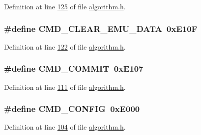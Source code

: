 Definition at line \hyperlink{a00021_source_l00125}{125} of file \hyperlink{a00021_source}{algorithm.\+h}.

\hypertarget{a00021_aa5f71f685588bc4e978cd6d595a5ea81}{
\subsubsection[{C\+M\+D\+\_\+\+C\+L\+E\+A\+R\+\_\+\+E\+M\+U\+\_\+\+D\+A\+T\+A}]{\setlength{\rightskip}{0pt plus 5cm}\#define C\+M\+D\+\_\+\+C\+L\+E\+A\+R\+\_\+\+E\+M\+U\+\_\+\+D\+A\+T\+A~0x\+E10\+F}}\label{a00021_aa5f71f685588bc4e978cd6d595a5ea81}


Definition at line \hyperlink{a00021_source_l00122}{122} of file \hyperlink{a00021_source}{algorithm.\+h}.

\hypertarget{a00021_a7df85bf97a6a032220d7a71c78be5206}{
\subsubsection[{C\+M\+D\+\_\+\+C\+O\+M\+M\+I\+T}]{\setlength{\rightskip}{0pt plus 5cm}\#define C\+M\+D\+\_\+\+C\+O\+M\+M\+I\+T~0x\+E107}}\label{a00021_a7df85bf97a6a032220d7a71c78be5206}


Definition at line \hyperlink{a00021_source_l00111}{111} of file \hyperlink{a00021_source}{algorithm.\+h}.

\hypertarget{a00021_aa87bfa4fccf7f7a4fc45afb1966a655f}{
\subsubsection[{C\+M\+D\+\_\+\+C\+O\+N\+F\+I\+G}]{\setlength{\rightskip}{0pt plus 5cm}\#define C\+M\+D\+\_\+\+C\+O\+N\+F\+I\+G~0x\+E000}}\label{a00021_aa87bfa4fccf7f7a4fc45afb1966a655f}


Definition at line \hyperlink{a00021_source_l00104}{104} of file \hyperlink{a00021_source}{algorithm.\+h}.

